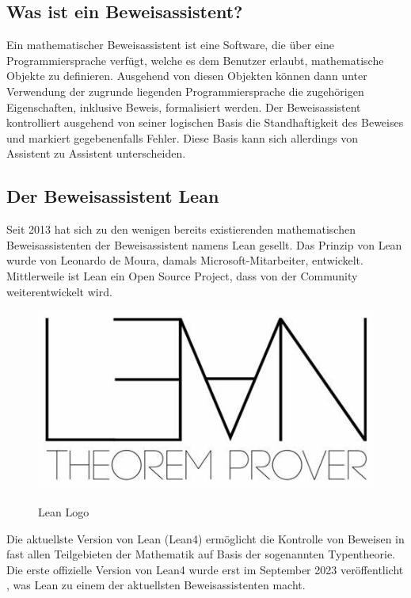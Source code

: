 \documentclass[10pt]{article}
\begin{document}
\subsection{Was ist ein Beweisassistent?}

\noindent Ein mathematischer Beweisassistent ist eine Software, die über eine Programmiersprache verfügt, welche es dem Benutzer erlaubt, mathematische Objekte zu definieren. Ausgehend von diesen Objekten können dann unter Verwendung der zugrunde liegenden Programmiersprache die zugehörigen Eigenschaften, inklusive Beweis, formalisiert werden. Der Beweisassistent kontrolliert ausgehend von seiner logischen Basis die Standhaftigkeit des Beweises und markiert gegebenenfalls Fehler. Diese Basis kann sich allerdings von Assistent zu Assistent unterscheiden. 

\subsection{Der Beweisassistent Lean}
Seit 2013 hat sich zu den wenigen bereits existierenden mathematischen Beweisassistenten der Beweisassistent namens Lean gesellt. Das Prinzip von Lean wurde von Leonardo de Moura, damals Microsoft-Mitarbeiter, entwickelt. Mittlerweile ist Lean ein Open Source Project, dass von der Community weiterentwickelt wird.\par

\begin{minipage}{6cm}
\begin{figure}[H]
    \centering
    \includegraphics[scale=0.20]{Lean Logo.jpg}
    \label{Abb1}
    \caption{Lean Logo \cite{Q12}}
    
\end{figure}
\end{minipage}
\begin{minipage}{10cm}
Die aktuellste Version von Lean (Lean4) ermöglicht die Kontrolle von Beweisen in fast allen Teilgebieten der Mathematik auf Basis der sogenannten Typentheorie. Die erste offizielle Version von Lean4 wurde erst im September 2023 veröffentlicht \cite{Q2}, was Lean zu einem der aktuellsten Beweisassistenten macht.
\end{minipage}
\end{document}

